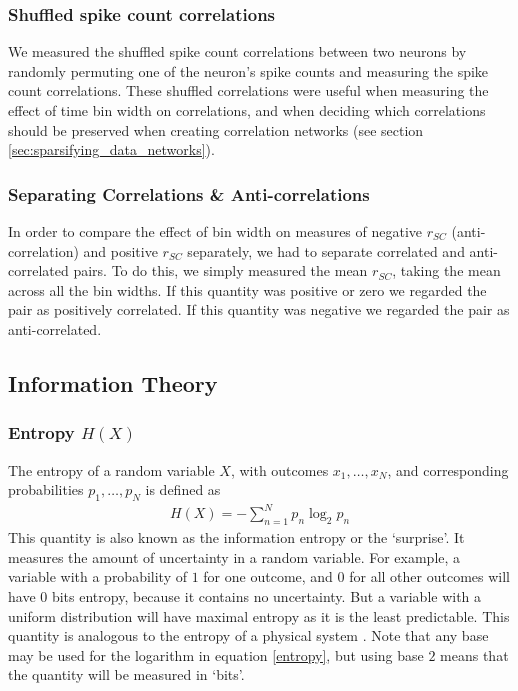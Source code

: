 \documentclass[a4paper,12pt]{article}
\theoremstyle{definition}
\begin{document}
        \subsubsection{Shuffled spike count correlations}
        We measured the shuffled spike count correlations between two neurons by randomly permuting one of the neuron's spike counts and measuring the spike count correlations. These shuffled correlations were useful when measuring the effect of time bin width on correlations, and when deciding which correlations should be preserved when creating correlation networks (see section \ref{sec:sparsifying_data_networks}). 

        \subsubsection{Separating Correlations \& Anti-correlations}\label{sec:corr_anti_corr} 
        In order to compare the effect of bin width on measures of negative $r_{SC}$ (anti-correlation) and positive $r_{SC}$ separately, we had to separate correlated and anti-correlated pairs. To do this, we simply measured the mean $r_{SC}$, taking the mean across all the bin widths. If this quantity was positive or zero we regarded the pair as positively correlated. If this quantity was negative we regarded the pair as anti-correlated.

    \subsection{Information Theory}\label{sec:information_theory}
        \subsubsection{Entropy $H(X)$}
        The entropy of a random variable $X$, with outcomes $x_1, \dots, x_N$, and corresponding probabilities $p_1, \dots, p_N$ is defined as
        \begin{align}\label{entropy}
        H(X) = -\sum_{n=1}^N p_n \log _2 p_n
        \end{align}
        This quantity is also known as the information entropy or the `surprise'. It measures the amount of uncertainty in a random variable. For example, a variable with a probability of $1$ for one outcome, and $0$ for all other outcomes will have 0 bits entropy, because it contains no uncertainty. But a variable with a uniform distribution will have maximal entropy as it is the least predictable. This quantity is analogous to the entropy of a physical system \cite{shannon}. Note that any base may be used for the logarithm in equation \ref{entropy}, but using base $2$ means that the quantity will be measured in `bits'.
\end{document}
